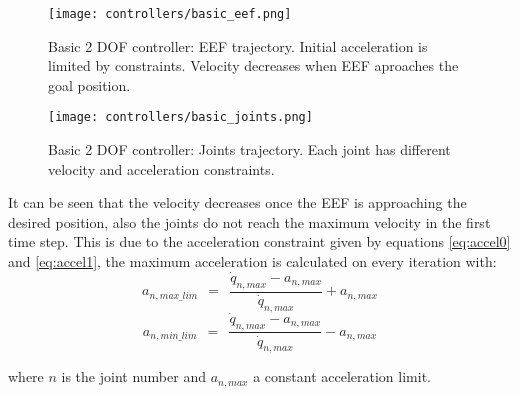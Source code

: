 \begin{figure}[H]
	\centering
	\texttt{[image: controllers/basic\_eef.png]}
	\vspace{-10pt}
	\caption{Basic 2 DOF controller: EEF trajectory. Initial acceleration is limited by constraints. Velocity decreases when EEF aproaches the goal position.}
	\vspace{-15pt}
	\label{fig:basic_eef}
\end{figure}
\begin{figure}[H]
	\centering
	\texttt{[image: controllers/basic\_joints.png]}
	\vspace{-10pt}
	\caption{Basic 2 DOF controller: Joints trajectory. Each joint has different velocity and acceleration constraints.}
	\vspace{-15pt}
	\label{fig:basic}
\end{figure}
It can be seen that the velocity decreases once the EEF is approaching the desired position, also the joints do not reach the maximum velocity in the first time step. This is due to the acceleration constraint given by equations \ref{eq:accel0} and \ref{eq:accel1}, the maximum acceleration is calculated on every iteration with:
\begin{equation}
a_{n,max\_lim}\ \ =\ \ \frac{\dot{q}_{n,max} - a_{n,max}}{\dot{q}_{n,max}} + a_{n,max}
\end{equation} 
\begin{equation}
a_{n,min\_lim}\ \ =\ \ \frac{\dot{q}_{n,max} - a_{n,max}}{\dot{q}_{n,max}} - a_{n,max}
\end{equation}

where $n$ is the joint number and $a_{n,max}$ a constant acceleration limit.

